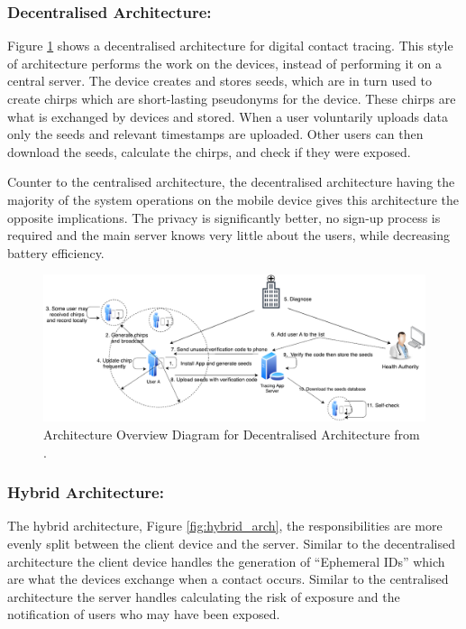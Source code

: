 \documentclass{l4proj}
\begin{document}
\subsubsection{Decentralised Architecture:}

Figure \ref{fig:decentralised_arch} shows a decentralised architecture for digital contact tracing. This style of architecture performs the work on the devices, instead of performing it on a central server. The device creates and stores seeds, which are in turn used to create chirps which are short-lasting pseudonyms for the device. These chirps are what is exchanged by devices and stored. When a user voluntarily uploads data only the seeds and relevant timestamps are uploaded. Other users can then download the seeds, calculate the chirps, and check if they were exposed.

Counter to the centralised architecture, the decentralised architecture having the majority of the system operations on the mobile device gives this architecture the opposite implications. The privacy is significantly better, no sign-up process is required and the main server knows very little about the users, while decreasing battery efficiency.

\begin{figure}[!htb]
    \centering
    \includegraphics[width=0.8\linewidth]{images/ahmed_decentralised.png}

    \caption{ Architecture Overview Diagram for Decentralised Architecture from \citet{ahmed_survey_2020}.
    }

    \label{fig:decentralised_arch}
\end{figure}

\subsubsection{Hybrid Architecture:}

The hybrid architecture, Figure \ref{fig:hybrid_arch}, the responsibilities are more evenly split between the client device and the server. Similar to the decentralised architecture the client device handles the generation of “Ephemeral IDs” which are what the devices exchange when a contact occurs. Similar to the centralised architecture the server handles calculating the risk of exposure and the notification of users who may have been exposed.
\end{document}
